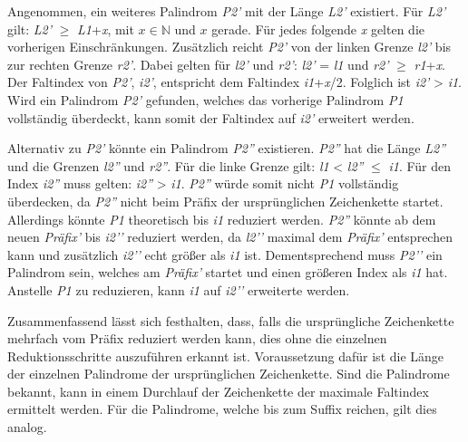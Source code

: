 Angenommen, ein weiteres Palindrom \textit{P2'} mit der Länge \textit{L2'} existiert. Für \textit{L2'} gilt: \textit{L2'} $\geq$ \textit{L1}+\textit{x}, mit $x \in \mathbb{N}$ und $x$ gerade. Für jedes folgende \textit{x} gelten die vorherigen Einschränkungen. Zusätzlich reicht \textit{P2'} von der linken Grenze \textit{l2'} bis zur rechten Grenze \textit{r2'}. Dabei gelten für \textit{l2'} und \textit{r2'}: \textit{l2'} = \textit{l1} und \textit{r2'} $\geq$ \textit{r1}+\textit{x}. Der Faltindex von \textit{P2'}, \textit{i2'}, entspricht dem Faltindex \textit{i1}+\textit{x}/2. Folglich ist \textit{i2'} > \textit{i1}. Wird ein Palindrom \textit{P2'} gefunden, welches das vorherige Palindrom \textit{P1} vollständig überdeckt, kann somit der Faltindex auf \textit{i2'} erweitert werden. 
 
Alternativ zu \textit{P2'} könnte ein Palindrom \textit{P2''} existieren. \textit{P2''} hat die Länge \textit{L2''} und die Grenzen \textit{l2''} und \textit{r2''}. Für die linke Grenze gilt: \textit{l1} <  \textit{l2''} $\leq$ \textit{i1}. Für den Index \textit{i2''} muss gelten: \textit{i2''} > \textit{i1}. \textit{P2''} würde somit nicht \textit{P1} vollständig überdecken, da \textit{P2''} nicht beim Präfix der ursprünglichen Zeichenkette startet. Allerdings könnte \textit{P1} theoretisch bis \textit{i1} reduziert werden. \textit{P2''} könnte ab dem neuen \textit{Präfix’} bis \textit{i2’'} reduziert werden, da \textit{l2’'} maximal dem \textit{Präfix’} entsprechen kann und zusätzlich \textit{i2’'} echt größer als \textit{i1} ist. Dementsprechend muss \textit{P2’'} ein Palindrom sein, welches am \textit{Präfix’} startet und einen größeren Index als \textit{i1} hat. Anstelle \textit{P1} zu reduzieren, kann \textit{i1} auf \textit{i2’'} erweiterte werden.

Zusammenfassend lässt sich festhalten, dass, falls die ursprüngliche Zeichenkette mehrfach vom Präfix reduziert werden kann, dies ohne die einzelnen Reduktionsschritte auszuführen erkannt ist. Voraussetzung dafür ist die Länge der einzelnen Palindrome der ursprünglichen Zeichenkette. Sind die Palindrome bekannt, kann in einem Durchlauf der Zeichenkette der maximale Faltindex ermittelt werden. Für die Palindrome, welche bis zum Suffix reichen, gilt dies analog.
%
